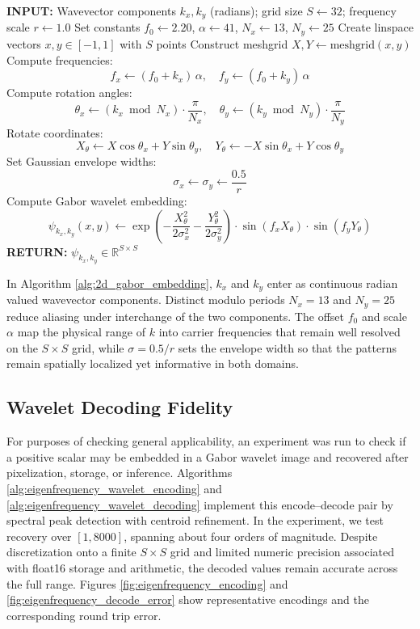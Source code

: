 \documentclass[preprint,review,12pt,numafflabel]{elsarticle}
\begin{document}
\begin{algorithm}[H]
\caption{2D Gabor Wavelet Embedding for Wavevectors}
\label{alg:2d_gabor_embedding}
\begin{algorithmic}[1]
\STATE \textbf{INPUT:} Wavevector components \( k_x, k_y \) (radians); grid size \( S \leftarrow 32 \); frequency scale \( r \leftarrow 1.0 \)
\STATE Set constants \( f_0 \leftarrow 2.20 \), \( \alpha \leftarrow 41 \), \( N_x \leftarrow 13 \), \( N_y \leftarrow 25 \)
\STATE Create linspace vectors \( x, y \in [-1, 1] \) with \( S \) points
\STATE Construct meshgrid \( X, Y \leftarrow \text{meshgrid}(x, y) \)
\STATE Compute frequencies:
\[
f_x \leftarrow (f_0 + k_x)\,\alpha, \quad f_y \leftarrow (f_0 + k_y)\,\alpha
\]
\STATE Compute rotation angles:
\[
\theta_x \leftarrow (k_x \bmod N_x) \cdot \frac{\pi}{N_x}, \quad \theta_y \leftarrow (k_y \bmod N_y) \cdot \frac{\pi}{N_y}
\]
\STATE Rotate coordinates:
\[
X_\theta \leftarrow X \cos \theta_x + Y \sin \theta_y, \quad
Y_\theta \leftarrow -X \sin \theta_x + Y \cos \theta_y
\]
\STATE Set Gaussian envelope widths:
\[
\sigma_x \leftarrow \sigma_y \leftarrow \frac{0.5}{r}
\]
\STATE Compute Gabor wavelet embedding:
\[
\psi_{k_x, k_y}(x, y) \leftarrow
\exp\left(-\frac{X_\theta^2}{2 \sigma_x^2} - \frac{Y_\theta^2}{2 \sigma_y^2}\right)
\cdot \sin(f_x X_\theta) \cdot \sin(f_y Y_\theta)
\]
\STATE \textbf{RETURN:} \( \psi_{k_x, k_y} \in \mathbb{R}^{S \times S} \)
\end{algorithmic}
\end{algorithm}

In Algorithm \ref{alg:2d_gabor_embedding}, \(k_x\) and \(k_y\) enter as continuous radian valued wavevector components. Distinct modulo periods \(N_x=13\) and \(N_y=25\) reduce aliasing under interchange of the two components. The offset \(f_0\) and scale \(\alpha\) map the physical range of \(k\) into carrier frequencies that remain well resolved on the \(S\times S\) grid, while \(\sigma=0.5/r\) sets the envelope width so that the patterns remain spatially localized yet informative in both domains.

\subsection{Wavelet Decoding Fidelity}
\label{ssec:wavelet_decoding}
For purposes of checking general applicability, an experiment was run to check if a positive scalar may be embedded in a Gabor wavelet image and recovered after pixelization, storage, or inference. Algorithms \ref{alg:eigenfrequency_wavelet_encoding} and \ref{alg:eigenfrequency_wavelet_decoding} implement this encode--decode pair by spectral peak detection with centroid refinement. In the experiment, we test recovery over \([1,8000]\), spanning about four orders of magnitude. Despite discretization onto a finite \(S\times S\) grid and limited numeric precision associated with float16 storage and arithmetic, the decoded values remain accurate across the full range. Figures \ref{fig:eigenfrequency_encoding} and \ref{fig:eigenfrequency_decode_error} show representative encodings and the corresponding round trip error.
\end{document}
